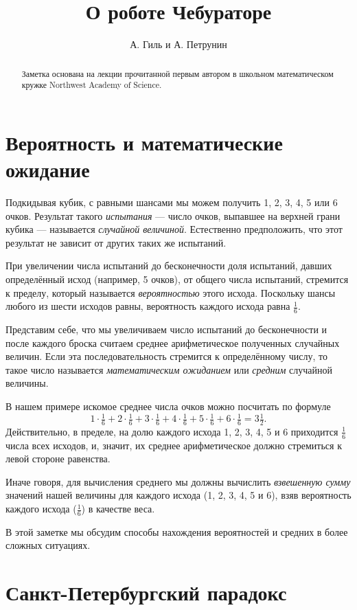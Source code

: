 \documentclass{article}
\begin{document}
\title{О роботе Чебураторе}
\author{А. Гиль и А. Петрунин}
\date{}
\maketitle
\begin{abstract}
Заметка основана на лекции прочитанной первым автором в школьном 
математическом кружке Northwest Academy of Science.
\end{abstract}

\section{Вероятность и математические ожидание}

Подкидывая кубик,
с равными шансами мы можем получить 1, 2, 3, 4, 5 или 6 очков.
Результат такого \emph{испытания} --- число очков, выпавшее на 
верхней грани кубика --- называется \emph{случайной величиной}.
Естественно предположить, что этот результат не зависит от других таких же испытаний.

При увеличении числа испытаний до бесконечности 
доля испытаний, давших определённый исход (например, 5 очков), 
от общего числа испытаний, стремится к пределу, 
который называется \emph{вероятностью} этого исхода.
Поскольку шансы любого из шести исходов равны,
вероятность каждого исхода равна $\tfrac16$.

Представим себе, что мы увеличиваем число испытаний до бесконечности
и после каждого броска считаем среднее арифметическое полученных случайных величин.
Если эта последовательность стремится к определённому числу,
то такое число называется \emph{математическим ожиданием} или \emph{средним} случайной величины.

В нашем примере искомое среднее числа очков можно посчитать по формуле
\[1\cdot\tfrac16+2\cdot\tfrac16+3\cdot\tfrac16+4\cdot\tfrac16+5\cdot\tfrac16+6\cdot\tfrac16=3\tfrac12.\]
Действительно, в пределе, 
на долю каждого исхода 1, 2, 3, 4, 5 и 6
приходится $\tfrac16$ числа всех исходов, 
и, значит, их среднее арифметическое должно 
стремиться к левой стороне равенства.

Иначе говоря, для вычисления среднего мы должны вычислить \emph{взвешенную сумму} значений нашей величины для каждого исхода
(1, 2, 3, 4, 5 и 6), 
взяв вероятность каждого исхода ($\tfrac16$)
в качестве веса.

В этой заметке мы обсудим способы нахождения 
вероятностей и средних в более сложных ситуациях.
 
\section{Санкт-Петербургский парадокс}
\end{document}
